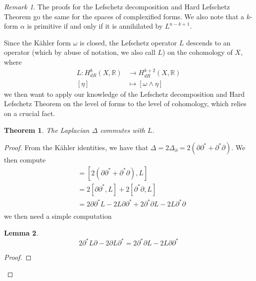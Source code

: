 \documentclass[psamsfonts, 12pt]{amsart}
\newtheorem{thm}{Theorem}[section]
\newtheorem{lem}[thm]{Lemma}
\theoremstyle{definition}
\theoremstyle{remark}
\newtheorem*{rem*}{Remark}
\newcommand{\R}{\mathbb{R}}
\begin{document}
%
\begin{rem*}
The proofs for the Lefschetz decomposition and Hard Lefschetz Theorem go the same for
the spaces of complexified forms. We also note that a $k$-form $\alpha$ is primitive
if and only if it is annihilated by $L^{n-k+1}$.
\end{rem*}
%
Since the K\"ahler form $\omega$ is closed, the Lefschetz operator $L$ descends
to an operator (which by abuse of notation, we also call $L$) on the cohomology
of $X$, where
\begin{align*}
L : H^k_{dR}(X,\R) &\to H^{k+2}_{dR}(X,\R) \\
[\eta] &\mapsto [\omega \wedge \eta]
\end{align*}
we then want to apply our knowledge of the Lefschetz decomposition and Hard Lefschetz
Theorem on the level of forms to the level of cohomology, which relies on a crucial
fact.
\begin{thm}
The Laplacian $\Delta$ commutes with $L$.
\end{thm}
%
\begin{proof}
From the K\"ahler identities, we have that
$\Delta = 2\Delta_{\partial } = 2(\partial\partial^* + \partial^*\partial)$. We then
compute
\begin{align*}
[\Delta, L] &= [2(\partial\partial^* + \partial^*\partial), L] \\
&= 2[\partial\partial^*,L] + 2[\partial^*\partial, L] \\
&= 2\partial\partial^* L - 2L\partial\partial^*
+ 2\partial^*\partial L - 2L\partial^*\partial \\
\end{align*}
we then need a simple computation
%
\begin{lem}
\[
2\partial^*L\partial - 2\partial L\partial^*
= 2\partial^*\partial L - 2L\partial\partial^*
\]
\end{lem}
%
\begin{proof}

\end{proof}
\end{proof}
%
\end{document}
